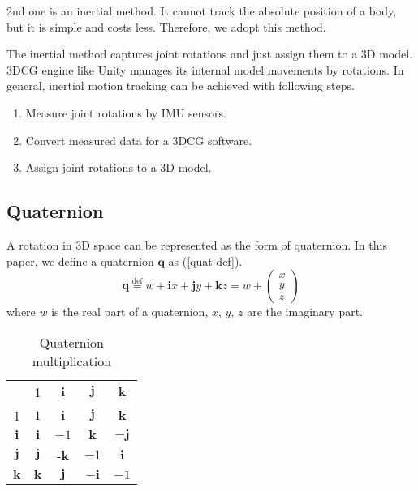 \documentclass[journal]{IEEEtran}
\begin{document}
2nd one is an inertial method.
It cannot track the absolute position of a body, but it is simple and costs less.
Therefore, we adopt this method.

The inertial method captures joint rotations and just assign them to a 3D model.
3DCG engine like Unity manages its internal model movements by rotations.
In general, inertial motion tracking can be achieved with following steps.
\begin{enumerate}
    \item Measure joint rotations by IMU sensors.
    \item Convert measured data for a 3DCG software.
    \item Assign joint rotations to a 3D model.
\end{enumerate}

\subsection{Quaternion}
A rotation in 3D space can be represented as the form of quaternion.
In this paper, we define a quaternion \(\bm{q}\) as (\ref{quat-def}).
\begin{equation}
    \bm{q} \overset{\mathrm{def}}{=} w + \mathbf{i}x + \mathbf{j}y + \mathbf{k}z = w + \begin{pmatrix}
        x \\
        y \\
        z
    \end{pmatrix} \label{quat-def}
\end{equation}
where \(w\) is the real part of a quaternion, \(x,\,y,\,z\) are the imaginary part.
\begin{table}[tb]
    \centering
    \caption{Quaternion multiplication} \label{quat-mult}
    \begin{tabular}{ccccc}
    \rowcolor[HTML]{9B9B9B} 
                                           & 1              & \(\mathbf{i}\)  & \(\mathbf{j}\)  & \(\mathbf{k}\)  \\
    \cellcolor[HTML]{9B9B9B}1              & \(1\)          & \(\mathbf{i}\)  & \(\mathbf{j}\)  & \(\mathbf{k}\)  \\
    \rowcolor[HTML]{EFEFEF} 
    \cellcolor[HTML]{9B9B9B}\(\mathbf{i}\) & \(\mathbf{i}\) & \(-1\)          & \(\mathbf{k}\)  & \(-\mathbf{j}\) \\
    \cellcolor[HTML]{9B9B9B}\(\mathbf{j}\) & \(\mathbf{j}\) & -\(\mathbf{k}\) & \(-1\)          & \(\mathbf{i}\)  \\
    \rowcolor[HTML]{EFEFEF} 
    \cellcolor[HTML]{9B9B9B}\(\mathbf{k}\) & \(\mathbf{k}\) & \(\mathbf{j}\)  & \(-\mathbf{i}\) & \(-1\)         
    \end{tabular}
\end{table}
\end{document}
